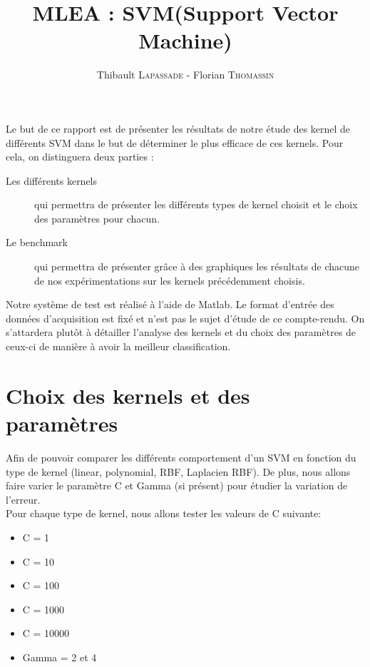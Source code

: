 \documentclass[fontsize=10pt, twoside=no]{scrartcl} %
\begin{document}
\title{MLEA : SVM(Support Vector Machine)}
\author{Thibault \textsc{Lapassade} - Florian \textsc{Thomassin}}
\date{}
\maketitle
\vspace*{-3cm}

\part{}

Le but de ce rapport est de présenter les résultats de notre étude des kernel de différents SVM dans le but de déterminer le plus efficace de ces kernels. Pour cela, on distinguera deux parties :

\begin{description}
\item[Les différents kernels] qui permettra de présenter les différents types de kernel choisit et le choix des paramètres pour chacun.
\item[Le benchmark] qui permettra de présenter grâce à des graphiques les résultats de chacune de nos expérimentations sur les kernels précédemment choisis.
\end{description}

Notre système de test est réalisé à l'aide de Matlab. Le format d'entrée des données d'acquisition est fixé et n'est pas le sujet d'étude de ce compte-rendu. On s'attardera plutôt à détailler l'analyse des kernels et du choix des paramètres de ceux-ci de manière à avoir la meilleur classification.

\part{Choix des kernels et des paramètres}

Afin de pouvoir comparer les différents comportement d'un SVM en fonction du type de kernel (linear, polynomial, RBF, Laplacien RBF). De plus, nous allons faire varier le paramètre C et Gamma (si présent) pour étudier la variation de l'erreur.\\

Pour chaque type de kernel, nous allons tester les valeurs de C suivante:
\begin{itemize}
	\item C = 1
	\item C = 10
	\item C = 100
	\item C = 1000
	\item C = 10000
	\item Gamma = 2 et 4
\end{itemize}
\end{document}
